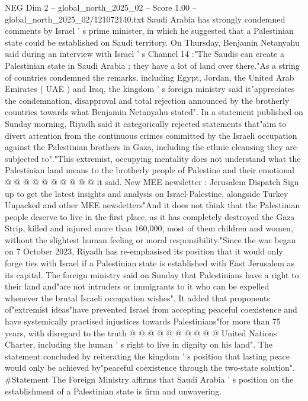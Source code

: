 \begin{textsample}{NEG Dim 2 – global\_north\_2025\_02 – Score 1.00 – global\_north\_2025\_02/121072140.txt}  \label{ex:f2_neg_007}
Saudi Arabia has strongly condemned comments by Israel ' s prime minister, in which he suggested that a Palestinian state could be established on Saudi territory.
On Thursday, Benjamin Netanyahu said during an interview with Israel ' s Channel 14 :"The Saudis can create a Palestinian state in Saudi Arabia ; they have a lot of land over there."As a string of countries condemned the remarks, including Egypt, Jordan, the United Arab Emirates ( UAE ) and Iraq, the kingdom ' s foreign ministry said it"appreciates the condemnation, disapproval and total rejection announced by the brotherly countries towards what Benjamin Netanyahu stated".
In a statement published on Sunday morning, Riyadh said it categorically rejected statements that"aim to divert attention from the continuous crimes committed by the Israeli occupation against the Palestinian brothers in Gaza, including the ethnic cleansing they are subjected to"."This extremist, occupying mentality does not understand what the Palestinian land means to the brotherly people of Palestine and their emotional @ @ @ @ @ @ @ @ @ @ it said.
New MEE newsletter : Jerusalem Dispatch Sign up to get the latest insights and analysis on Israel-Palestine, alongside Turkey Unpacked and other MEE newsletters"And it does not think that the Palestinian people deserve to live in the first place, as it has completely destroyed the Gaza Strip, killed and injured more than 160,000, most of them children and women, without the slightest human feeling or moral responsibility."Since the war began on 7 October 2023, Riyadh has re-emphasised its position that it would only forge ties with Israel if a Palestinian state is established with East Jerusalem as its capital.
The foreign ministry said on Sunday that Palestinians have a right to their land and"are not intruders or immigrants to it who can be expelled whenever the brutal Israeli occupation wishes".
It added that proponents of"extremist ideas"have prevented Israel from accepting peaceful coexistence and have systemically practised injustices towards Palestinians"for more than 75 years, with disregard to the truth @ @ @ @ @ @ @ @ @ @ United Nations Charter, including the human ' s right to live in dignity on his land".
The statement concluded by reiterating the kingdom ' s position that lasting peace would only be achieved by"peaceful coexistence through the two-state solution". \#Statement The Foreign Ministry affirms that Saudi Arabia ' s position on the establishment of a Palestinian state is firm and unwavering.

\end{textsample}
